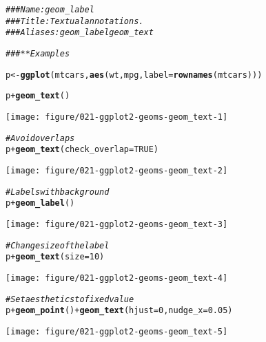 \documentclass[a4paper,titlepage]{tufte-handout}\usepackage[]{graphicx}\usepackage[]{color}
\makeatletter
\def\maxwidth{ %
  \ifdim\Gin@nat@width>\linewidth
    \linewidth
  \else
    \Gin@nat@width
  \fi
}
\newcommand{\hlnum}[1]{\textcolor[rgb]{0.686,0.059,0.569}{#1}}%
\newcommand{\hlcom}[1]{\textcolor[rgb]{0.678,0.584,0.686}{\textit{#1}}}%
\newcommand{\hlopt}[1]{\textcolor[rgb]{0,0,0}{#1}}%
\newcommand{\hlstd}[1]{\textcolor[rgb]{0.345,0.345,0.345}{#1}}%
\newcommand{\hlkwb}[1]{\textcolor[rgb]{0.69,0.353,0.396}{#1}}%
\newcommand{\hlkwc}[1]{\textcolor[rgb]{0.333,0.667,0.333}{#1}}%
\newcommand{\hlkwd}[1]{\textcolor[rgb]{0.737,0.353,0.396}{\textbf{#1}}}%
\newenvironment{kframe}{%
 \def\at@end@of@kframe{}%
 \ifinner\ifhmode%
  \def\at@end@of@kframe{\end{minipage}}%
  \begin{minipage}{\columnwidth}%
 \fi\fi%
 \def\FrameCommand##1{\hskip\@totalleftmargin \hskip-\fboxsep
 \colorbox{shadecolor}{##1}\hskip-\fboxsep
     \hskip-\linewidth \hskip-\@totalleftmargin \hskip\columnwidth}%
 \MakeFramed {\advance\hsize-\width
   \@totalleftmargin\z@ \linewidth\hsize
   \@setminipage}}%
 {\par\unskip\endMakeFramed%
 \at@end@of@kframe}
\newenvironment{knitrout}{}{} %
\makeatother
\begin{document}
\begin{knitrout}
\color{fgcolor}\begin{kframe}
\begin{alltt}
\hlcom{### Name: geom_label}
\hlcom{### Title: Textual annotations.}
\hlcom{### Aliases: geom_label geom_text}

\hlcom{### ** Examples}

\hlstd{p} \hlkwb{<-} \hlkwd{ggplot}\hlstd{(mtcars,} \hlkwd{aes}\hlstd{(wt, mpg,} \hlkwc{label} \hlstd{=} \hlkwd{rownames}\hlstd{(mtcars)))}

\hlstd{p} \hlopt{+} \hlkwd{geom_text}\hlstd{()}
\end{alltt}
\end{kframe}
\texttt{[image: figure/021-ggplot2-geoms-geom\_text-1]} 
\begin{kframe}\begin{alltt}
\hlcom{# Avoid overlaps}
\hlstd{p} \hlopt{+} \hlkwd{geom_text}\hlstd{(}\hlkwc{check_overlap} \hlstd{=} \hlnum{TRUE}\hlstd{)}
\end{alltt}
\end{kframe}
\texttt{[image: figure/021-ggplot2-geoms-geom\_text-2]} 
\begin{kframe}\begin{alltt}
\hlcom{# Labels with background}
\hlstd{p} \hlopt{+} \hlkwd{geom_label}\hlstd{()}
\end{alltt}
\end{kframe}
\texttt{[image: figure/021-ggplot2-geoms-geom\_text-3]} 
\begin{kframe}\begin{alltt}
\hlcom{# Change size of the label}
\hlstd{p} \hlopt{+} \hlkwd{geom_text}\hlstd{(}\hlkwc{size} \hlstd{=} \hlnum{10}\hlstd{)}
\end{alltt}
\end{kframe}
\texttt{[image: figure/021-ggplot2-geoms-geom\_text-4]} 
\begin{kframe}\begin{alltt}
\hlcom{# Set aesthetics to fixed value}
\hlstd{p} \hlopt{+} \hlkwd{geom_point}\hlstd{()} \hlopt{+} \hlkwd{geom_text}\hlstd{(}\hlkwc{hjust} \hlstd{=} \hlnum{0}\hlstd{,} \hlkwc{nudge_x} \hlstd{=} \hlnum{0.05}\hlstd{)}
\end{alltt}
\end{kframe}
\texttt{[image: figure/021-ggplot2-geoms-geom\_text-5]} 
\begin{kframe}\begin{alltt}

\end{alltt}
\end{kframe}
\end{knitrout}
\end{document}
